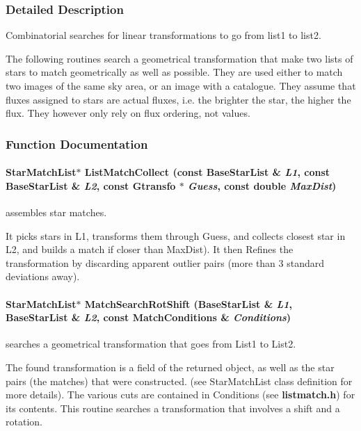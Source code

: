 \subsubsection{Detailed Description}
Combinatorial searches for linear transformations to go from list1 to list2.

 The following routines search a geometrical transformation that make two lists of stars to match geometrically as well as possible. They are used either to match two images of the same sky area, or an image with a catalogue. They assume that fluxes assigned to stars are actual fluxes, i.e. the brighter the star, the higher the flux. They however only rely on flux ordering,  not values.



\subsubsection{Function Documentation}
\paragraph{\setlength{\rightskip}{0pt plus 5cm}Star\-Match\-List$\ast$ List\-Match\-Collect (const Base\-Star\-List \& {\em L1}, const Base\-Star\-List \& {\em L2}, const {\bf Gtransfo} $\ast$ {\em Guess}, const double {\em Max\-Dist})}\hfill\label{listmatch_h_a2}


assembles star matches.

It picks stars in L1, transforms them through Guess, and collects closest star in L2, and builds a match if closer than Max\-Dist). It then Refines the transformation by discarding apparent outlier pairs (more than 3 standard deviations away). 
\paragraph{\setlength{\rightskip}{0pt plus 5cm}Star\-Match\-List$\ast$ Match\-Search\-Rot\-Shift (Base\-Star\-List \& {\em L1}, Base\-Star\-List \& {\em L2}, const Match\-Conditions \& {\em Conditions})}\hfill\label{listmatch_h_a0}


searches a geometrical transformation that goes from List1 to List2.

The found transformation is a field of the returned object, as well as the star pairs (the matches) that were constructed. (see Star\-Match\-List class definition for more details). The various cuts are contained in Conditions (see {\bf listmatch.h}) for its contents. This routine searches a transformation that involves a shift and a rotation. 